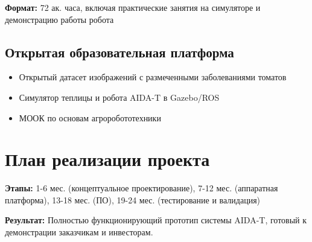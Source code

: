 \documentclass[12pt,a4paper]{article}
\begin{document}
\textbf{Формат:} 72 ак. часа, включая практические занятия на симуляторе и демонстрацию работы робота

\subsection{Открытая образовательная платформа}
\begin{itemize}
    \item Открытый датасет изображений с размеченными заболеваниями томатов
    \item Симулятор теплицы и робота AIDA-T в Gazebo/ROS
    \item МООК по основам агроробототехники
\end{itemize}

\section{План реализации проекта}

\textbf{Этапы:} 1-6 мес. (концептуальное проектирование), 7-12 мес. (аппаратная платформа), 13-18 мес. (ПО), 19-24 мес. (тестирование и валидация)

\textbf{Результат:} Полностью функционирующий прототип системы AIDA-T, готовый к демонстрации заказчикам и инвесторам.
\end{document}
